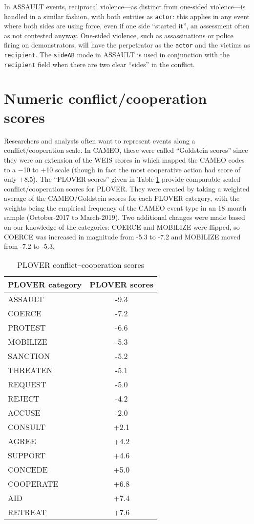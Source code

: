 \documentclass[11pt]{report}
\newcommand{\plcat}[1]{\textsf{#1}}
\newcommand{\plmod}[1]{\texttt{#1}}
\begin{document}
In \plcat{ASSAULT} events, reciprocal violence---as distinct from one-sided violence---is handled in a similar fashion, with both entities as \texttt{actor}: this applies in any event where both sides are using force, even if one side ``started it'', an assessment often as not contested anyway. One-sided violence, such as assassinations or police firing on demonstrators, will have the perpetrator as the \texttt{actor} and the victims as \texttt{recipient}. The \plmod{sideAB} mode in  \plcat{ASSAULT} is used in conjunction with the \texttt{recipient} field when there are two clear ``sides'' in the conflict.




\section{Numeric conflict/cooperation scores}

Researchers and analysts often want to represent events along a conflict/cooperation scale. In CAMEO, these were called ``Goldstein scores'' since they were an extension of the WEIS scores in \cite{Goldstein92} which mapped the CAMEO codes to a $-$10 to $+$10 scale (though in fact the most cooperative action had score of only $+$8.5). The ``PLOVER scores'' given in Table \ref{tab:ploverscores} provide comparable scaled conflict/cooperation scores for PLOVER. They were created by taking a weighted average of the CAMEO/Goldstein scores for each PLOVER category, with the weights being the empirical frequency of the CAMEO event type in an 18 month sample (October-2017 to March-2019). Two additional changes were made based on our knowledge of the categories: COERCE and MOBILIZE were flipped, so COERCE was increased in magnitude from -5.3 to -7.2 and MOBILIZE moved from -7.2 to -5.3.

\begin{table}[htp]
\begin{center}
\caption{PLOVER conflict--cooperation scores}
\begin{tabular}{lc}
\hline
\textbf{PLOVER category} & \textbf{PLOVER scores} \\
\hline
ASSAULT  & -9.3\\
COERCE & -7.2\\
PROTEST & -6.6\\
MOBILIZE & -5.3\\
SANCTION & -5.2\\
THREATEN & -5.1\\
REQUEST & -5.0\\
REJECT & -4.2\\
ACCUSE &  -2.0\\
CONSULT &  +2.1\\
AGREE & +4.2\\
SUPPORT & +4.6\\
CONCEDE & +5.0\\
COOPERATE & +6.8\\
AID & +7.4\\
RETREAT & +7.6 \\
\hline
\end{tabular}
\end{center}
\label{tab:ploverscores}
\end{table}
\end{document}
